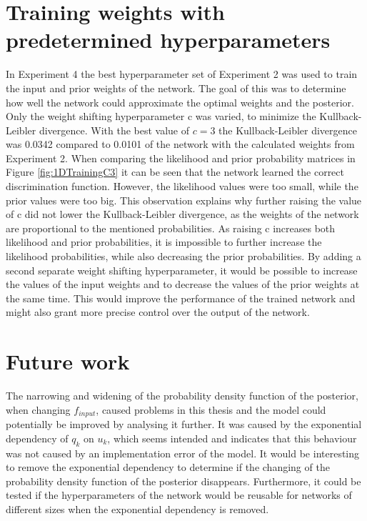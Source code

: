 \section{Training weights with predetermined hyperparameters}
In Experiment 4 the best hyperparameter set of Experiment 2 was used to train the input and prior weights of the network. The goal of this was to determine how well the network could approximate the optimal weights and the posterior. Only the weight shifting hyperparameter c was varied, to minimize the Kullback-Leibler divergence. With the best value of $c = 3$ the Kullback-Leibler divergence was 0.0342 compared to 0.0101 of the network with the calculated weights from Experiment 2. When comparing the likelihood and prior probability matrices in Figure \ref{fig:1DTrainingC3} it can be seen that the network learned the correct discrimination function. However, the likelihood values were too small, while the prior values were too big. This observation explains why further raising the value of c did not lower the Kullback-Leibler divergence, as the weights of the network are proportional to the mentioned probabilities. As raising c increases both likelihood and prior probabilities, it is impossible to further increase the likelihood probabilities, while also decreasing the prior probabilities. By adding a second separate weight shifting hyperparameter, it would be possible to increase the values of the input weights and to decrease the values of the prior weights at the same time. This would improve the performance of the trained network and might also grant more precise control over the output of the network.

\section{Future work}
The narrowing and widening of the probability density function of the posterior, when changing $f_{input}$, caused problems in this thesis and the model could potentially be improved by analysing it further. It was caused by the exponential dependency of $q_k$ on $u_k$, which seems intended and indicates that this behaviour was not caused by an implementation error of the model. It would be interesting to remove the exponential dependency to determine if the changing of the probability density function of the posterior disappears. Furthermore, it could be tested if the hyperparameters of the network would be reusable for networks of different sizes when the exponential dependency is removed.

